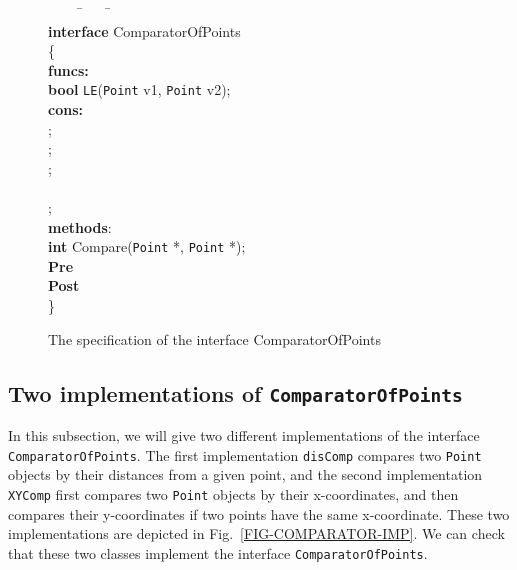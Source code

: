 \documentclass[fleqn]{llncs}
\begin{document}
\begin{figure}
\begin{center}
\begin{boxedminipage}{0.8\textwidth}
\scriptsize
\begin{tabbing}
\ \ \ \ \=\ \ \ \ \=\ \ \ \ \=\\
\textbf{interface} ComparatorOfPoints\\
\{\\
\textbf{funcs:}\\
    \>\textbf{bool} \texttt{LE}(\texttt{Point} v1, \texttt{Point} v2);\\
\textbf{cons:}\\
    \>;\\
    \>;\\
    \>;\\
    \>\\
    \>  \>;\\
\textbf{methods}:\\
    \>\textbf{int} Compare(\texttt{Point} *, \texttt{Point} *);\\
    \>  \>\textbf{Pre}\ \ \\
    \>  \>\textbf{Post}  \\
\}\\
\end{tabbing}
\end{boxedminipage}
\end{center}
\caption{The specification of the interface ComparatorOfPoints}\label{FIG-COMPARATOR}
\end{figure}

\subsection{Two implementations of \texttt{ComparatorOfPoints}}
In this subsection, we will give two different implementations of the interface \texttt{ComparatorOfPoints}.
The first implementation \texttt{disComp} compares two \texttt{Point} objects by their distances from a given point,
and the second implementation \texttt{XYComp} first compares two \texttt{Point} objects by
their x-coordinates, and then compares their y-coordinates if two points have the same x-coordinate.
These two implementations are depicted in Fig.~\ref{FIG-COMPARATOR-IMP}.
We can check that these two classes implement the interface \texttt{ComparatorOfPoints}.
\end{document}
